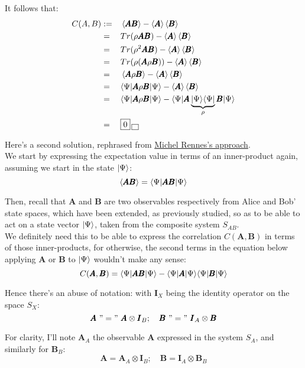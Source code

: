 \documentclass[solutions.tex]{subfiles}
\begin{document}
It follows that:
\begin{equation*}\begin{aligned}
	C(A, B) &:=&& \left\langle \pmb{AB} \right\rangle - \left\langle \pmb{A} \right\rangle\left\langle \pmb{B} \right\rangle \\
	~ &=&& Tr(\rho \pmb{AB}) - \left\langle \pmb{A} \right\rangle\left\langle \pmb{B} \right\rangle \\
	~ &=&& Tr(\rho^2\pmb{A}\pmb{B}) - \left\langle \pmb{A} \right\rangle\left\langle \pmb{B} \right\rangle \\
	~ &=&& Tr(\rho(\pmb{A}\rho\pmb{B})) - \left\langle \pmb{A} \right\rangle\left\langle \pmb{B} \right\rangle \\
	~ &=&& \left\langle \pmb{A}\rho\pmb{B} \right\rangle - \left\langle \pmb{A} \right\rangle\left\langle \pmb{B} \right\rangle \\
	~ &=&& \langle \Psi|\pmb{A}\rho\pmb{B}|\Psi\rangle
		- \left\langle \pmb{A} \right\rangle\left\langle \pmb{B} \right\rangle \\
	~ &=&& \langle \Psi|\pmb{A}\rho\pmb{B}|\Psi\rangle
		- \langle \Psi|\pmb{A}\underbrace{|\Psi\rangle\langle \Psi|}_{\rho}
			\pmb{B}|\Psi\rangle \\
	~ &=&& \boxed{0} \,\boxed{\,} \\
\end{aligned}\end{equation*}

\hr

Here's a second solution, rephrased from
\href{https://leminimumtheorique.jimdofree.com/le%C3%A7on-7/exercice-7-9/}%
{Michel Rennes's approach}. \\

We start by expressing the expectation value in terms of an inner-product
again, assuming we start in the state $|\Psi\rangle$:
\[
	\left\langle \pmb{AB} \right\rangle = \langle \Psi|\pmb{AB}|\Psi\rangle
\]

Then, recall that $\bm{A}$ and $\bm{B}$ are two observables respectively
from Alice and Bob' state spaces, which have been extended, as previously
studied, so as to be able to act on a state vector $|\Psi\rangle$, taken from
the composite system $S_{AB}$. \\

We definitely need this to be able to express the correlation $C(\bm{A},\bm{B})$
in terms of those inner-products, for otherwise, the second terms in the
equation below applying $\bm{A}$ or $\bm{B}$ to $|\Psi\rangle$ wouldn't
make any sense:
\[
	C(\pmb{A}, \pmb{B}) = \langle \Psi|\pmb{AB}|\Psi\rangle
		- \langle \Psi|\pmb{A}|\Psi\rangle\langle \Psi|\pmb{B}|\Psi\rangle
\]

Hence there's an abuse of notation: with $\bm{I}_X$ being the
identity operator on the space $S_X$:
\[
	\pmb{A}\ "="\ \pmb{A}\otimes\pmb{I}_B;\quad
	\pmb{B}\ "="\ \pmb{I}_A\otimes\pmb{B}
\]

For clarity, I'll note $\bm{A}_A$ the observable $\bm{A}$
expressed in the system $S_A$, and similarly for $\bm{B}_B$:
\[
	\bm{A}=\bm{A}_A\otimes\bm{I}_B;\quad
	\bm{B}=\bm{I}_A\otimes\bm{B}_B
\]
\end{document}
